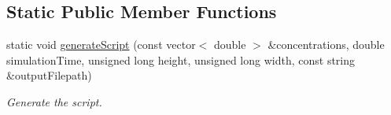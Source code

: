 \subsection*{\-Static \-Public \-Member \-Functions}
\begin{DoxyCompactItemize}
\item 
static void \hyperlink{classmultiscale_1_1video_1_1RectangularGnuplotScriptGenerator_a8a2e69a85d54df5bacd2e18d27993c14}{generate\-Script} (const vector$<$ double $>$ \&concentrations, double simulation\-Time, unsigned long height, unsigned long width, const string \&output\-Filepath)
\begin{DoxyCompactList}\small\item\em \-Generate the script. \end{DoxyCompactList}\end{DoxyCompactItemize}
